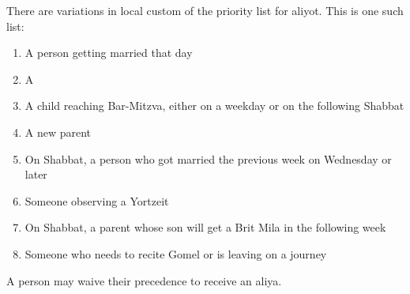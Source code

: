 There are variations in local custom of the priority list for aliyot.  This is one such list\parencite*[78:11]{Kitzur}:\begin{enumerate}
		\item A person getting married that day
		\item A 
		\item A child reaching Bar-Mitzva, either on a weekday or on the following Shabbat
		\item A new parent
		\item On Shabbat, a person who got married the previous week on Wednesday or later
		\item Someone observing a Yortzeit
		\item On Shabbat, a parent whose son will get a Brit Mila in the following week
		\item Someone who needs to recite Gomel or is leaving on a journey
	\end{enumerate}
	
	A person may waive their precedence to receive an aliya.
